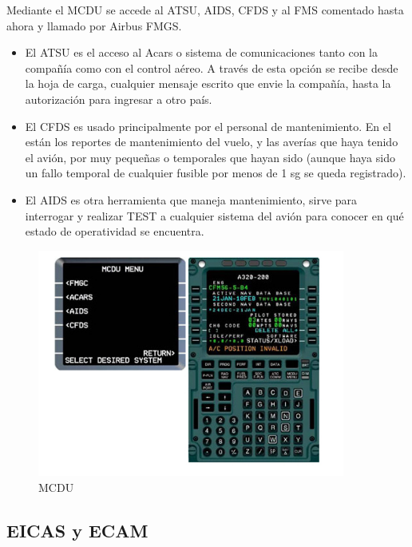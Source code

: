 Mediante el \ac{MCDU} se accede al \ac{ATSU}, \ac{AIDS}, \ac{CFDS} y al \ac{FMS} 
comentado hasta ahora y llamado por Airbus \ac{FMGS}.

\begin{itemize}
\item El \ac{ATSU} es el acceso al Acars o sistema de comunicaciones
  tanto con la compa\~n\'ia como con el control a\'ereo. A trav\'es de
  esta opci\'on se recibe desde la hoja de carga, cualquier mensaje
  escrito que envie la compa\~n\'ia, hasta la autorizaci\'on para
  ingresar a otro pa\'is.

\item   El \ac{CFDS} es usado principalmente por el personal de
  mantenimiento.  En el est\'an los reportes de mantenimiento del
  vuelo, y las aver\'ias que haya tenido el avi\'on, por muy
  peque\~nas o temporales que hayan sido (aunque haya sido un fallo
  temporal de cualquier fusible por menos de 1 sg se queda
  registrado).

\item   El \ac{AIDS} es otra herramienta que maneja mantenimiento, sirve
  para interrogar y realizar TEST a cualquier sistema del avi\'on para
  conocer en qu\'e estado de operatividad se encuentra.
\end{itemize}


\begin{figure}[!h]
  \centering
  \includegraphics[width=0.9\textwidth]{01.tablero.instrumentos/imagenes/1.4.pantalla.electronica/mcdu.jpg}
  \caption{MCDU}
\label{fig:01.MCDU}
\end{figure}

\subsection{EICAS y ECAM}
\label{sec:01.eicas+ecam}

